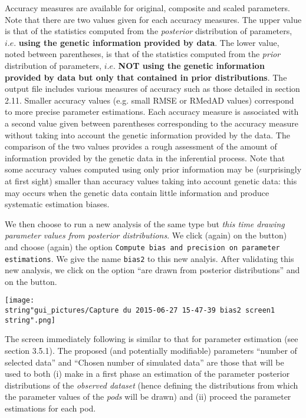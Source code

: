 Accuracy measures are available for original, composite and scaled
parameters. Note that there are two values given for each accuracy
measures. The upper value is that of the statistics computed from
the \emph{posterior} distribution of parameters, $i.e.$ \textbf{using
the genetic information provided by data}. The lower value, noted
between parentheses, is that of the statistics computed from the \emph{prior}
distribution of parameters, $i.e.$ \textbf{NOT using the genetic
information provided by data but only that contained in prior distributions}.
The output file includes various measures of accuracy such as those
detailed in section 2.11. Smaller accuracy values (e.g. small RMSE
or RMedAD values) correspond to more precise parameter estimations.
Each accuracy measure is associated with a second value given between
parentheses corresponding to the accuracy measure without taking into
account the genetic information provided by the data. The comparison
of the two values provides a rough assessment of the amount of information
provided by the genetic data in the inferential process. Note that
some accuracy values computed using only prior information may be
(surprisingly at first sight) smaller than accuracy values taking
into account genetic data: this may occurs when the genetic data contain
little information and produce systematic estimation biases.

We then choose to run a new analysis of the same type but \emph{this
time drawing parameter values from posterior distributions}. We click
(again) on the  button) and choose
(again) the option \texttt{Compute bias and precision on parameter
estimations}. We give the name \texttt{bias2} to this new analyis.
After validating this new analysis, we click on the option ``are
drawn from posterior distributions'' and on the 
button.

\texttt{[image: \\string"gui\_pictures/Capture du 2015-06-27 15-47-39 bias2 screen1\\string".png]}

The screen immediately following is similar to that for parameter
estimation (see section 3.5.1). The proposed (and potentially modifiable)
parameters ``number of selected data'' and ``Chosen number of simulated
data'' are those that will be used to both (i) make in a first phase
an estimation of the parameter posterior distributions of the \emph{observed
dataset} (hence defining the distributions from which the parameter
values of the \emph{pods} will be drawn) and (ii) proceed the parameter
estimations for each pod.

